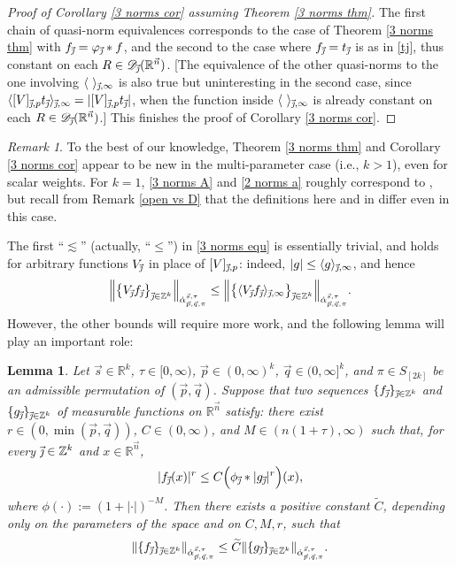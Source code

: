 \documentclass[11pt, reqno]{amsart}
\newtheorem{lemma}[theorem]{Lemma}
\theoremstyle{definition}
\theoremstyle{remark}
\newtheorem{remark}[theorem]{Remark}
\numberwithin{equation}{section}
\newcommand{\D}{\mathscr D}
\newcommand{\R}{\mathbb R}
\newcommand{\Z}{\mathbb Z}
\newcommand{\vj}{\vec{\textit{\j}}}
\newcommand{\vn}{\vec n}
\newcommand{\vp}{\vec p}
\newcommand{\vq}{\vec q}
\newcommand{\vs}{\vec s}
\newcommand{\aatau}{\dot{\alpha}^{\vs,\tau}_{\vp,\vq,\pi}}
\newcommand{\Ave}[3]{\langle#1\rangle_{#2,#3}}
\newcommand{\Red}[3]{[#1]_{#2,#3}}
\newcommand{\abs}[1]{|#1|}
\newcommand{\Norm}[2]{\|#1\|_{#2}}
\newcommand{\BNorm}[2]{\Big\|#1\Big\|_{#2}}
\begin{document}
\begin{proof}[Proof of Corollary \ref{3 norms cor} assuming Theorem \ref{3 norms thm}]
The first chain of quasi-norm equivalences corresponds to the case of Theorem \ref{3 norms thm} with $f_{\vj}=\varphi_{\vj}*f$, and the second to the case where $f_{\vj}=t_{\vj}$ is as in \eqref{tj}, thus constant on each $R\in\D_{\vj}(\R^{\vn})$. [The equivalence of the other quasi-norms to the one involving $\Ave{\ }{\vj}{\infty}$ is also true but uninteresting in the second case, since $\Ave{\Red{V}{\vj}{p}t_{\vj}}{\vj}{\infty}=\abs{\Red{V}{\vj}{p}t_{\vj}}$, when the function inside $\Ave{\ }{\vj}{\infty}$ is already constant on each $R\in\D_{\vj}(\R^{\vn})$.]
This finishes the proof of Corollary \ref{3 norms cor}.
\end{proof}

\begin{remark}\label{3 norms rem}
To the best of our knowledge, Theorem \ref{3 norms thm} and Corollary \ref{3 norms cor} appear to be new in the multi-parameter case (i.e., $k>1$), even for scalar weights. For $k=1$, \eqref{3 norms A} and \eqref{2 norms a} roughly correspond to \cite[Theorems 3.9 and 3.27]{BHYY:1a}, but recall from Remark \ref{open vs D} that the definitions here and in \cite{BHYY:1a} differ even in this case.
\end{remark}

The first ``$\lesssim$'' (actually, ``$\leq$'') in \eqref{3 norms equ} is essentially trivial, and holds for arbitrary functions $V_{\vj}$ in place of $\Red{V}{\vj}{p}$: indeed, $\abs{g}\leq\Ave{g}{\vj}{\infty}$, and hence
\begin{equation}\label{equi easy}
\BNorm{\big\{V_{\vj}f_{\vj} \big\}_{\vj\in\Z^k} }{\aatau}
\leq\BNorm{\big\{\Ave{V_{\vj}f_{\vj}}{\vj}{\infty} \big\}_{\vj\in\Z^k} }{\aatau}.
\end{equation}
However, the other bounds will require more work, and the following lemma will play an important role:

\begin{lemma}\label{convo bd A bd}
Let $\vs\in\R^k$, $\tau\in[0,\infty)$, $\vp\in(0,\infty)^k$, $\vq\in(0,\infty]^k$,
and $\pi\in S_{[2k]}$ be an admissible permutation of $(\vp,\vq)$.
Suppose that two sequences $\{f_{\vj}\}_{\vj\in\Z^k}$ and $\{g_{\vj}\}_{\vj\in\Z^k}$
of measurable functions on $\R^{\vn}$ satisfy:
there exist $r\in(0,\min(\vp,\vq))$,
$C\in(0,\infty)$, and $M\in(n(1+\tau),\infty)$ such that,
for every $\vj\in\Z^k$ and $x\in\R^{\vn}$,
\begin{equation}\label{143}
\abs{f_{\vj}(x)}^r\leq C \Big( \phi_{\vj}*\abs{g_{\vj}}^r \Big) (x),
\end{equation}
where $\phi(\cdot):=(1+\abs{\cdot})^{-M}$.
Then there exists a positive constant $\widetilde{C}$, depending only on the parameters of the space and on $C,M,r$, such that
\begin{equation*}
\Norm{\{f_{\vj}\}_{\vj\in\Z^k}}{\aatau}
\leq \widetilde{C} \Norm{\{g_{\vj}\}_{\vj\in\Z^k}}{\aatau}.
\end{equation*}
\end{lemma}
\end{document}
